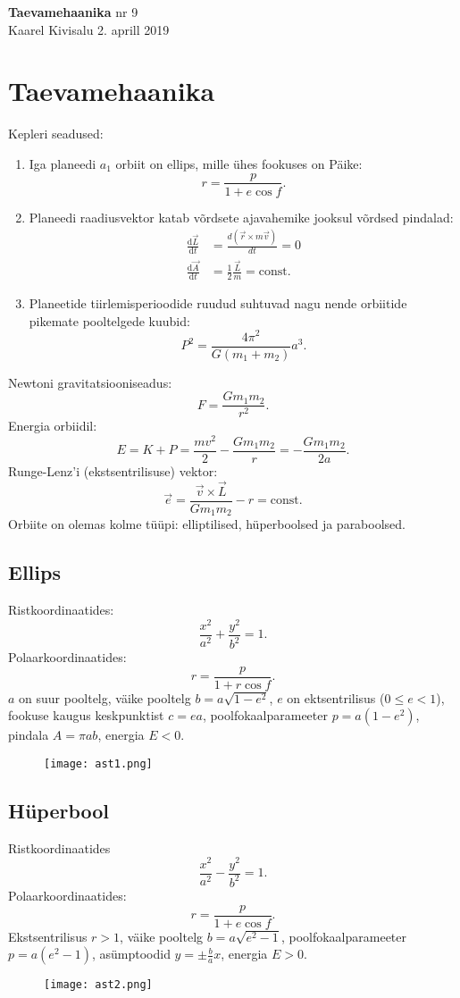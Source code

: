 \documentclass[a4paper,11pt,twocolumn]{article}
\begin{document}
{\huge \textbf{Taevamehaanika} \hfill \normalsize{nr 9} \\
{Kaarel Kivisalu \hfill 2. aprill 2019}

\section{Taevamehaanika}
Kepleri seadused:
\vspace{-1em}
\begin{enumerate}
    \item Iga planeedi $a_1$ orbiit on ellips, mille ühes fookuses on Päike:
        \[
            r=\frac{p}{1+e \cos f}
        .\]
    \item Planeedi raadiusvektor katab võrdsete ajavahemike jooksul võrdsed pindalad:
        \begin{align*}
            \frac{\text{d} \vec{L}}{\text{d}t}&= \frac{d(\vec{r}\times m \vec{v})}{dt}= 0  \\
            \frac{\text{d} \vec{A}}{\text{d}t}&= \frac{1}{2}\frac{\vec{L}}{m}=\text{const}
        .\end{align*}
    \item Planeetide tiirlemisperioodide ruudud suhtuvad nagu nende orbiitide pikemate pooltelgede kuubid:
        \[
            P^2=\frac{4\pi^2}{G(m_1+m_2)}a^3
        .\]
\end{enumerate}

Newtoni gravitatsiooniseadus:
\[
F=\frac{Gm_1m_2}{r^2}
.\]
Energia orbiidil:
\[
E=K+P=\frac{mv^2}{2}-\frac{Gm_1m_2}{r}=-\frac{Gm_1m_2}{2a}
.\]
Runge-Lenz'i (ekstsentrilisuse) vektor:
\[
\vec{e}=\frac{\vec{v}\times \vec{L}}{Gm_1m_2}-\hat{r}=\text{const}
.\]
Orbiite on olemas kolme tüüpi: elliptilised, hüperboolsed ja paraboolsed.
\subsection{Ellips}
Ristkoordinaatides:
\[
\frac{x^2}{a^2}+\frac{y^2}{b^2}=1
.\]
Polaarkoordinaatides:
\[
r=\frac{p}{1+r \cos f}
.\]
$a$ on suur pooltelg, väike pooltelg $b=a\sqrt{1-e^2}$, $e$ on ektsentrilisus ($0\le e<1$), fookuse kaugus keskpunktist $c=ea$, poolfokaalparameeter $p=a(1-e^2)$, pindala $A=\pi ab$, energia $E<0$.
\begin{figure}[h!]
    \centering
    \texttt{[image: ast1.png]}
    \label{fig:ast1-png}
\end{figure}

\subsection{Hüperbool}
Ristkoordinaatides
\[
\frac{x^2}{a^2}-\frac{y^2}{b^2}=1
.\]
Polaarkoordinaatides:
\[
r=\frac{p}{1+e \cos f}
.\]
Ekstsentrilisus $r>1$, väike pooltelg $b=a\sqrt{e^2-1}$, poolfokaalparameeter $p=a(e^2-1)$, asümptoodid $y=\pm \frac{b}{a}x$, energia $E>0$.
\begin{figure}[h!]
    \centering
    \texttt{[image: ast2.png]}
    \label{fig:ast2-png}
\end{figure}

}
\end{document}
